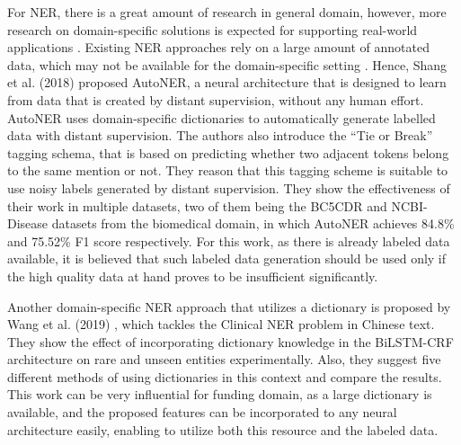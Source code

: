 \documentclass{report}
\theoremstyle{definition}
\theoremstyle{remark}
\begin{document}
For NER, there is a great amount of research in general domain, however, more research on domain-specific solutions is expected for supporting real-world applications \cite{quote1}. Existing NER approaches rely on a large amount of annotated data, which may not be available for the domain-specific setting \cite{NERDict2}. Hence, Shang et al. (2018) \cite{NERDict2} proposed AutoNER, a neural architecture that is designed to learn from data that is created by distant supervision, without any human effort. AutoNER uses domain-specific dictionaries to automatically generate labelled data with distant supervision. The authors also introduce the ``Tie or Break'' tagging schema, that is based on predicting whether two adjacent tokens belong to the same mention or not. They reason that this tagging scheme is suitable to use noisy labels generated by distant supervision. They show the effectiveness of their work in multiple datasets, two of them being the BC5CDR \cite{bc5cdr} and NCBI-Disease \cite{ncbi} datasets from the biomedical domain, in which AutoNER achieves 84.8\% and 75.52\% F1 score respectively. For this work, as there is already labeled data available, it is believed that such labeled data generation should be used only if the high quality data at hand proves to be insufficient significantly.

Another domain-specific NER approach that utilizes a dictionary is proposed by Wang et al. (2019) \cite{MedDict}, which tackles the Clinical NER problem in Chinese text. They show the effect of incorporating dictionary knowledge in the BiLSTM-CRF architecture on rare and unseen entities experimentally. Also, they suggest five different methods of using dictionaries in this context and compare the results. This work can be very influential for funding domain, as a large dictionary is available, and the proposed features can be incorporated to any neural architecture easily, enabling to utilize both this resource and the labeled data.
\end{document}
